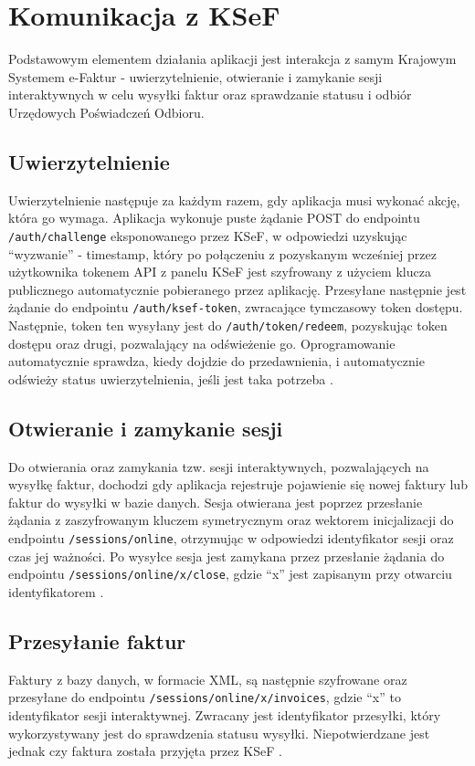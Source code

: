 \section{Komunikacja z KSeF}
Podstawowym elementem działania aplikacji jest interakcja z samym Krajowym Systemem e-Faktur - uwierzytelnienie, otwieranie i zamykanie sesji interaktywnych w celu wysyłki faktur oraz sprawdzanie statusu i odbiór Urzędowych Poświadczeń Odbioru. 

\subsection{Uwierzytelnienie}
Uwierzytelnienie następuje za każdym razem, gdy aplikacja musi wykonać akcję, która go wymaga. Aplikacja wykonuje puste żądanie POST do endpointu \texttt{/auth/challenge} eksponowanego przez KSeF, w odpowiedzi uzyskując \enquote{wyzwanie} - timestamp, który po połączeniu z pozyskanym wcześniej przez użytkownika tokenem API z panelu KSeF jest szyfrowany z użyciem klucza publicznego automatycznie pobieranego przez aplikację. Przesyłane następnie jest żądanie do endpointu \texttt{/auth/ksef-token}, zwracające tymczasowy token dostępu. Następnie, token ten wysyłany jest do \texttt{/auth/token/redeem}, pozyskując token dostępu oraz drugi, pozwalający na odświeżenie go. Oprogramowanie automatycznie sprawdza, kiedy dojdzie do przedawnienia, i automatycznie odświeży status uwierzytelnienia, jeśli jest taka potrzeba \parencite{ksef_api_docs}.

\subsection{Otwieranie i zamykanie sesji}
Do otwierania oraz zamykania tzw. sesji interaktywnych, pozwalających na wysyłkę faktur, dochodzi gdy aplikacja rejestruje pojawienie się nowej faktury lub faktur do wysyłki w bazie danych. Sesja otwierana jest poprzez przesłanie żądania z zaszyfrowanym kluczem symetrycznym oraz wektorem inicjalizacji do endpointu \texttt{/sessions/online}, otrzymując w odpowiedzi identyfikator sesji oraz czas jej ważności. Po wysyłce sesja jest zamykana przez przesłanie żądania do endpointu \texttt{/sessions/online/x/close}, gdzie \enquote{x} jest zapisanym przy otwarciu identyfikatorem \parencite{ksef_api_docs}.

\subsection{Przesyłanie faktur}
Faktury z bazy danych, w formacie XML, są następnie szyfrowane oraz przesyłane do endpointu \texttt{/sessions/online/x/invoices}, gdzie \enquote{x} to identyfikator sesji interaktywnej. Zwracany jest identyfikator przesyłki, który wykorzystywany jest do sprawdzenia statusu wysyłki. Niepotwierdzane jest jednak czy faktura została przyjęta przez KSeF \parencite{ksef_api_docs}.

